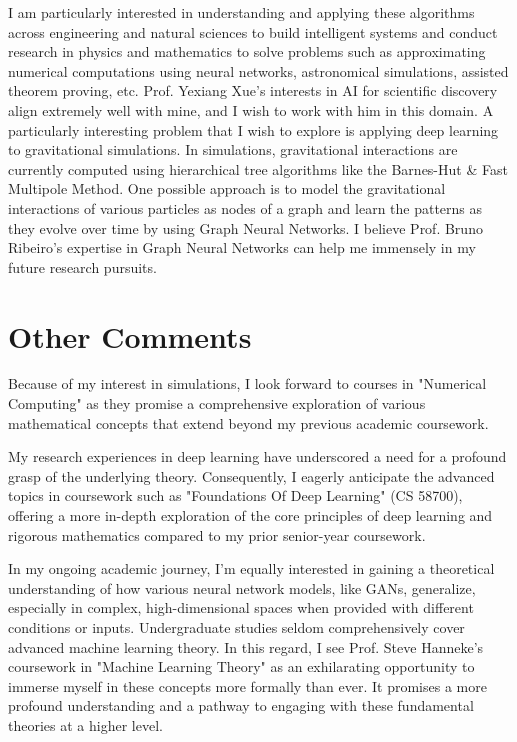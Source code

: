 \documentclass{article}
\begin{document}
I am particularly interested in understanding and applying these algorithms
across engineering and natural sciences to build intelligent systems and conduct
research in physics and mathematics to solve problems such as approximating
numerical computations using neural networks, astronomical simulations, assisted
theorem proving, etc. Prof. Yexiang Xue's interests in AI for scientific
discovery align extremely well with mine, and I wish to work with him in this
domain. A particularly interesting problem that I wish to explore is applying
deep learning to gravitational simulations. In simulations, gravitational
interactions are currently computed using hierarchical tree algorithms like the
Barnes-Hut \& Fast Multipole Method. One possible approach is to model the
gravitational interactions of various particles as nodes of a graph and learn
the patterns as they evolve over time by using Graph Neural Networks. I believe
Prof. Bruno Ribeiro's expertise in Graph Neural Networks can help me immensely
in my future research pursuits. 

\section*{Other Comments}

\hspace*{0.25in}Because of my interest in simulations, I look forward to courses in "Numerical
Computing" as they promise a comprehensive exploration of various mathematical
concepts that extend beyond my previous academic coursework.

My research experiences in deep learning have underscored a need for a profound
grasp of the underlying theory. Consequently, I eagerly anticipate the advanced
topics in coursework such as "Foundations Of Deep Learning" (CS 58700), offering
a more in-depth exploration of the core principles of deep learning and rigorous
mathematics compared to my prior senior-year coursework.

In my ongoing academic journey, I’m equally interested in gaining a theoretical
understanding of how various neural network models, like GANs, generalize,
especially in complex, high-dimensional spaces when provided with different
conditions or inputs. Undergraduate studies seldom comprehensively cover
advanced machine learning theory. In this regard, I see Prof. Steve Hanneke’s
coursework in "Machine Learning Theory" as an exhilarating opportunity to
immerse myself in these concepts more formally than ever. It promises a more
profound understanding and a pathway to engaging with these fundamental theories
at a higher level.
\end{document}
